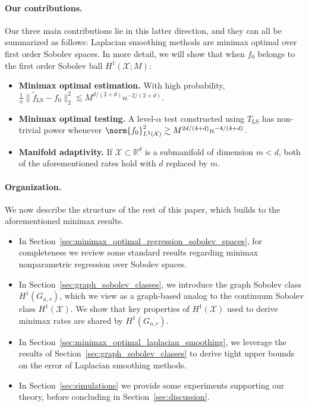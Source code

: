\documentclass{article}
\newcommand{\Reals}{\mathbb{R}}
\newcommand{\1}{\mathbf{1}}
\newcommand{\Rd}{\Reals^d}
\newcommand{\Xset}{\mathcal{X}}
\newcommand{\Leb}{L}
\newcommand{\mc}[1]{\mathcal{#1}}
\newcommand{\wt}[1]{\widetilde{#1}}
\newcommand{\LS}{\mathrm{LS}}
\theoremstyle{alden}
\theoremstyle{aldenthm}
\theoremstyle{definition}
\theoremstyle{remark}
\begin{document}
\paragraph{Our contributions.} Our three main contributions lie in this latter direction, and they can all be summarized as follows: Laplacian smoothing methods are minimax optimal over first order Sobolev spaces. In more detail, we will show that when $f_0$ belongs to the first order Sobolev ball $H^1(\Xset;M)$:
\begin{itemize}
	\item \textbf{Minimax optimal estimation.} With high probability, $\frac{1}{n}\bigl\|\wt{f}_{\LS} - f_0\bigr\|_{2}^2 \lesssim M^{d/(2+d)}n^{-2/(2 + d)}$.
	\item \textbf{Minimax optimal testing.}
	A level-$\alpha$ test constructed using $T_{\LS}$ has non-trivial power whenever $\norm{f_0}_{\Leb^2(\Xset)}^2 \gtrsim M^{2d/(4 + d)}n^{-4/(4 + d)}$. 
	\item \textbf{Manifold adaptivity.}
	If $\mc{X} \subset \Rd$ is a submanifold of dimension $m < d$, both of the aforementioned rates hold with $d$ replaced by $m$.
\end{itemize}

\paragraph{Organization.} We now describe the structure of the rest of this paper, which builds to the aforementioned minimax results.
\begin{itemize}
	\item In Section~\ref{sec:minimax_optimal_regression_sobolev_spaces}, for completeness we review some standard results regarding minimax nonparametric regression over Sobolev spaces.
	\item In Section~\ref{sec:graph_sobolev_classes}, we introduce the graph Sobolev class $H^1(G_{n,r})$, which we view as a graph-based analog to the continuum Sobolev class $H^1(\Xset)$. We show that key properties of $H^1(\Xset)$ used to derive minimax rates are shared by $H^1(G_{n,r})$.
	\item In Section~\ref{sec:minimax_optimal_laplacian_smoothing}, we leverage the results of Section~\ref{sec:graph_sobolev_classes} to derive tight upper bounds on the error of Laplacian smoothing methods.
	\item In Section~\ref{sec:simulations} we provide some experiments supporting our theory, before concluding in Section~\ref{sec:discussion}.
\end{itemize}
\end{document}
